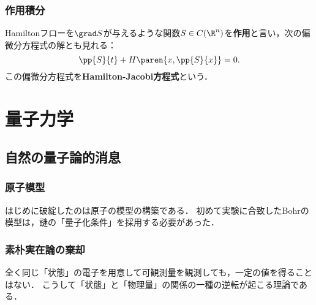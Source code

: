 \documentclass[uplatex,dvipdfmx]{jsreport}
\begin{document}
\subsection{作用積分}

\begin{definition}[action]
    Hamiltonフローを$\grad S$が与えるような関数$S\in C(\R^n)$を\textbf{作用}と言い，次の偏微分方程式の解とも見れる：
    \[\pp{S}{t}+H\paren{x,\pp{S}{x}}=0.\]
    この偏微分方程式を\textbf{Hamilton-Jacobi方程式}という．
\end{definition}



\chapter{量子力学}

\begin{quotation}
    
\end{quotation}

\section{自然の量子論的消息}

\subsection{原子模型}

\begin{tcolorbox}[colframe=ForestGreen, colback=ForestGreen!10!white,breakable,colbacktitle=ForestGreen!40!white,coltitle=black,fonttitle=\bfseries\sffamily,
title=]
    はじめに破綻したのは原子の模型の構築である．
    初めて実験に合致したBohrの模型は，謎の「量子化条件」を採用する必要があった．
\end{tcolorbox}

\subsection{素朴実在論の棄却}

\begin{tcolorbox}[colframe=ForestGreen, colback=ForestGreen!10!white,breakable,colbacktitle=ForestGreen!40!white,coltitle=black,fonttitle=\bfseries\sffamily,
title=確定的に実在するものは「状態」だけである]
    全く同じ「状態」の電子を用意して可観測量を観測しても，一定の値を得ることはない．
    こうして「状態」と「物理量」の関係の一種の逆転が起こる理論である．
\end{tcolorbox}
\end{document}
